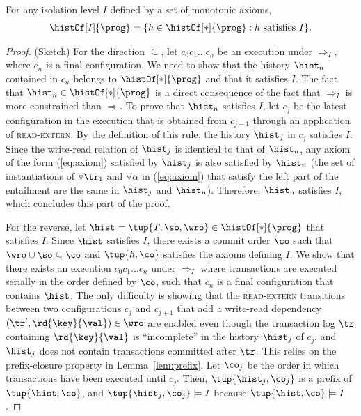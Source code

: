  \begin{theorem}
For any isolation level $I$ defined by a set of monotonic axioms,
\begin{align*}
\histOf[I]{\prog} = \{ h \in \histOf[*]{\prog}: h\mbox{ satisfies }I\}.
\end{align*}
 \end{theorem}
 \begin{proof}(Sketch)
For the direction $\subseteq$, let $c_0 c_1\ldots c_n$ be an execution under $\Rightarrow_I$, where $c_n$ is a final configuration. We need to show that the history $\hist_n$ contained in $c_n$ belongs to $\histOf[*]{\prog}$ and that it satisfies $I$. The fact that $\hist_n\in \histOf[*]{\prog}$ is a direct consequence of the fact that $\Rightarrow_I$ is more constrained than $\Rightarrow$. To prove that $\hist_n$ satisfies $I$, let $c_j$ be the latest configuration in the execution that is obtained from $c_{j-1}$ through an application of \textsc{read-extern}. By the definition of this rule, the history $\hist_j$ in $c_j$ satisfies $I$. Since the write-read relation of $\hist_j$ is identical to that of $\hist_n$, any axiom of the form (\ref{eq:axiom}) satisfied by $\hist_j$ is also satisfied by $\hist_n$ (the set of instantiations of $\forall \tr_1$ and $\forall \alpha$ in (\ref{eq:axiom}) that satisfy the left part of the entailment are the same in $\hist_j$ and $\hist_n$). Therefore, $\hist_n$ satisfies $I$, which concludes this part of the proof.

For the reverse, let $\hist=\tup{T, \so, \wro}\in \histOf[*]{\prog}$ that satisfies $I$. Since $\hist$ satisfies $I$, there exists a commit order $\co$ such that $\wro\cup\so\subseteq \co$ and $\tup{h,\co}$ satisfies the axioms defining $I$. We show that there exists an execution $c_0 c_1\ldots c_n$ under $\Rightarrow_I$ where transactions are executed serially in the order defined by $\co$, such that $c_n$ is a final configuration that contains $\hist$. The only difficulty is showing that the \textsc{read-extern} transitions between two configurations $c_j$ and $c_{j+1}$ that add a write-read dependency $(\tr',\rd{\key}{\val})\in\wro$ are enabled even though the transaction log $\tr$ containing $\rd{\key}{\val}$ is ``incomplete'' in the history $\hist_j$ of $c_j$, and $\hist_j$ does not contain transactions committed after $\tr$. This relies on the prefix-closure property in Lemma~\ref{lem:prefix}.
Let $\co_j$ be the order in which transactions have been executed until $c_j$. Then, $\tup{\hist_j,\co_j}$ is a prefix of $\tup{\hist,\co}$, and $\tup{\hist_j,\co_j}\models I$ because $\tup{\hist,\co}\models I$.
 \end{proof}

